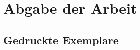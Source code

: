 \section{Abgabe der Arbeit}
\label{sec:Abgabe der Arbeit}

\subsection{Gedruckte Exemplare}
\label{sub:Gedruckte Exemplare}

